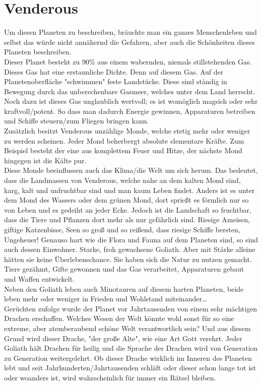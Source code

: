\documentclass{book}
\begin{document}
\section{Venderous}
Um diesen Planeten zu beschreiben, bräuchte man ein ganzes Menschenleben und selbst das würde nicht annähernd die Gefahren, aber auch die Schönheiten dieses Planeten beschreiben.\\
Dieser Planet besteht zu 90\% aus einem wabernden, niemals stillstehenden Gas. Dieses Gas hat eine erstaunliche Dichte. Denn auf diesem Gas. Auf der Planetenoberfläche "schwimmen" feste Landstücke. Diese sind ständig in Bewegung durch das unberechenbare Gasmeer, welches unter dem Land herrscht. Noch dazu ist dieses Gas unglaublich wertvoll; es ist womöglich magsich oder sehr kraftvoll/potent. So dass man dadurch Energie gewinnen, Apparaturen betreiben und Schiffe steuern/zum Fliegen bringen kann.\\
Zusätzlich besitzt Venderous unzählige Monde, welche stetig mehr oder weniger zu werden scheinen. Jeder Mond beherbergt absolute elementare Kräfte. Zum Beispiel besteht der eine aus komplettem Feuer und Hitze, der nächste Mond hingegen ist die Kälte pur.\\
Diese Monde beeinflussen auch das Klima/die Welt um sich herum. Das bedeutet, dass die Landmassen von Venderous, welche nahe an dem kalten Mond sind, karg, kalt und unfruchtbar sind und man kaum Leben findet. Anders ist es unter dem Mond des Wassers oder dem grünen Mond, dort sprießt es förmlich nur so von Leben und es gedeiht an jeder Ecke. Jedoch ist die Landschaft so fruchtbar, dass die Tiere und Pflanzen dort mehr als nur gefährlich sind. Riesige Ameisen, giftige Katzenbisse, Seen so groß und so reißend, dass riesige Schiffe bersten, Ungeheuer!
Genauso hart wie die Flora und Fauna auf dem Planeten sind, so sind auch dessen Einwohner. Starke, froh gewachsene Goliath. Aber mit Stärke alleine hätten sie keine Überlebenschance. Sie haben sich die Natur zu nutzen gemacht. Tiere gezähmt, Gifte gewonnen und das Gas verarbeitet, Apparaturen gebaut und Waffen entwickelt.\\
Neben den Goliath leben auch Minotauren auf diesem harten Planeten, beide leben mehr oder weniger in Frieden und Wohlstand miteinander\dots\\
Gerüchten zufolge wurde der Planet vor Jahrtausenden von einem sehr mächtigen Drachen erschaffen. 
Welches Wesen der Welt könnte wohl sonst für so eine extreme, aber atemberaubend schöne Welt verantwortlich sein?
Und aus diesem Grund wird dieser Drache, "der große Alte", wie eine Art Gott verehrt. Jeder Goliath hält Drachen für heilig und die Sprache der Drachen wird von Generation zu Generation weitergelehrt. Ob dieser Drache wirklich im Inneren des Planeten lebt und seit Jahrhunderten/Jahrtausenden schläft oder dieser schon lange tot ist oder woanders ist, wird wahrscheinlich für immer ein Rätsel bleiben.\\
\end{document}
